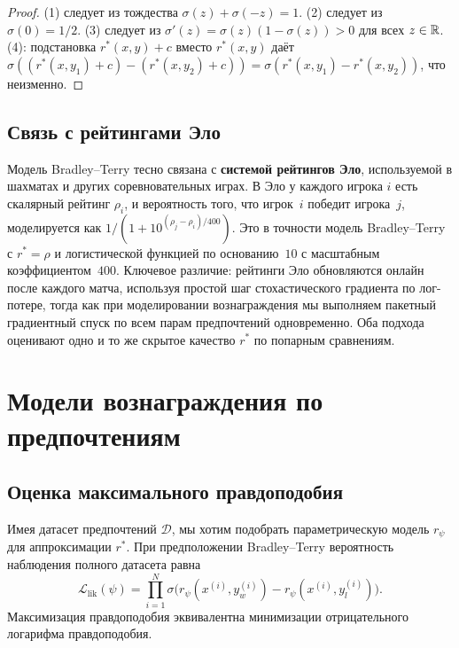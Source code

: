 \begin{proof}
(1) следует из тождества $\sigma(z) + \sigma(-z) = 1$. (2) следует из $\sigma(0) = 1/2$. (3) следует из $\sigma'(z) = \sigma(z)(1-\sigma(z)) > 0$ для всех $z\in\mathbb{R}$. (4): подстановка $r^*(x,y) + c$ вместо $r^*(x,y)$ даёт $\sigma((r^*(x,y_1)+c) - (r^*(x,y_2)+c)) = \sigma(r^*(x,y_1)-r^*(x,y_2))$, что неизменно.
\end{proof}

\subsection{Связь с рейтингами Эло}

Модель Bradley--Terry тесно связана с \textbf{системой рейтингов Эло}, используемой в шахматах и других соревновательных играх. В Эло у каждого игрока $i$ есть скалярный рейтинг $\rho_i$, и вероятность того, что игрок~$i$ победит игрока~$j$, моделируется как $1/(1 + 10^{(\rho_j - \rho_i)/400})$. Это в точности модель Bradley--Terry с $r^* = \rho$ и логистической функцией по основанию~$10$ с масштабным коэффициентом~$400$. Ключевое различие: рейтинги Эло обновляются онлайн после каждого матча, используя простой шаг стохастического градиента по лог-потере, тогда как при моделировании вознаграждения мы выполняем пакетный градиентный спуск по всем парам предпочтений одновременно. Оба подхода оценивают одно и то же скрытое качество $r^*$ по попарным сравнениям.

\section{Модели вознаграждения по предпочтениям}
\label{sec:preference-rm}

\subsection{Оценка максимального правдоподобия}

Имея датасет предпочтений $\mathcal{D}$, мы хотим подобрать параметрическую модель $r_\psi$ для аппроксимации $r^*$. При предположении Bradley--Terry вероятность наблюдения полного датасета равна
\begin{equation}
\label{eq:bt-likelihood}
\mathcal{L}_{\text{lik}}(\psi)
= \prod_{i=1}^{N} \sigma\!\bigl(r_\psi(x^{(i)}, y_w^{(i)}) - r_\psi(x^{(i)}, y_l^{(i)})\bigr).
\end{equation}
Максимизация правдоподобия эквивалентна минимизации отрицательного логарифма правдоподобия.

